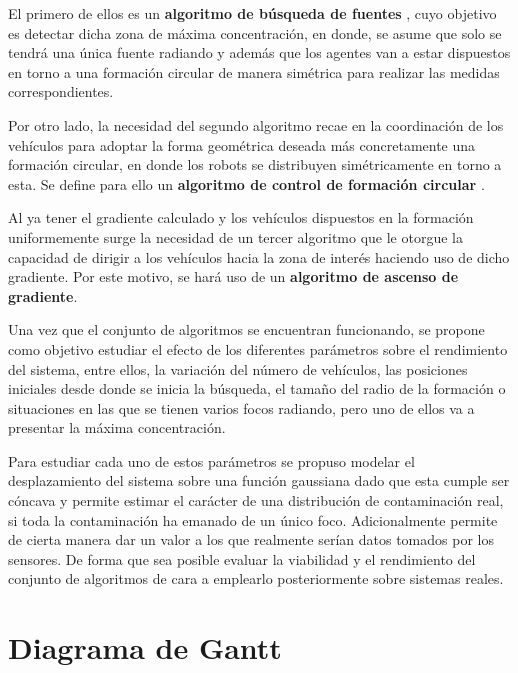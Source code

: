 El primero de ellos es un \textbf{algoritmo de búsqueda de fuentes} \cite{Estimacion_Gradiente}, cuyo objetivo es detectar dicha zona de máxima concentración, en donde, se asume que solo se tendrá una única fuente radiando y además que los agentes van a estar dispuestos en torno a una formación circular de manera simétrica para realizar las medidas correspondientes. 

Por otro lado, la necesidad del segundo algoritmo recae en la coordinación de los vehículos para adoptar la forma geométrica deseada más concretamente una formación circular, en donde los robots se distribuyen simétricamente en torno a esta. Se define para ello un \textbf{algoritmo de control de formación circular} \cite{Control_Formacion}.

Al ya tener el gradiente calculado y los vehículos dispuestos en la formación uniformemente surge la necesidad de un tercer algoritmo que le otorgue la capacidad de dirigir a los vehículos hacia la zona de interés haciendo uso de dicho gradiente. Por este motivo, se hará uso de un \textbf{algoritmo de ascenso de gradiente}.

Una vez que el conjunto de algoritmos se encuentran funcionando, se propone como objetivo estudiar el efecto de los diferentes parámetros sobre el rendimiento del sistema, entre ellos, la variación del número de vehículos, las posiciones iniciales desde donde se inicia la búsqueda, el tamaño del radio de la formación o situaciones en las que se tienen varios focos radiando, pero uno de ellos va a presentar la máxima concentración.

Para estudiar cada uno de estos parámetros se propuso modelar el desplazamiento del sistema sobre una función gaussiana dado que esta cumple ser cóncava y permite estimar el carácter de una distribución de contaminación real, si toda la contaminación ha emanado de un único foco. Adicionalmente permite de cierta manera dar un valor a los que realmente serían datos tomados por los sensores. De forma que sea posible evaluar la viabilidad y el rendimiento del conjunto de algoritmos de cara a emplearlo posteriormente sobre sistemas reales.

\section{Diagrama de Gantt}\label{Gantt}

